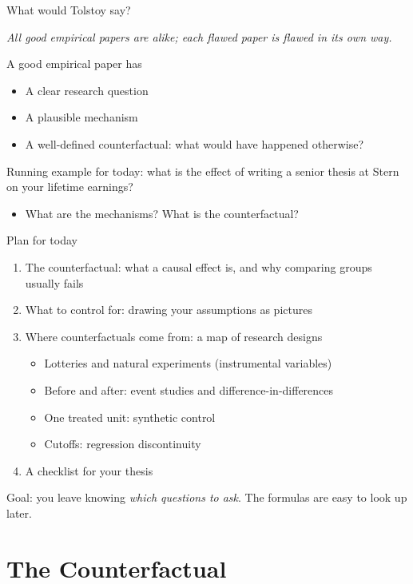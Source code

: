 \documentclass[aspectratio=169,11pt]{beamer}
\begin{document}
\begin{frame}{What would Tolstoy say?}
\begin{center}
\emph{All good empirical papers are alike; each flawed paper is flawed in its own way.}
\end{center}
\bigskip
A good empirical paper has
\begin{itemize}
	\item A clear \alert{research question}
	\item A plausible \alert{mechanism}
	\item A well-defined \alert{counterfactual}: what would have happened otherwise?
\end{itemize}
\bigskip
Running example for today: \alert{what is the effect of writing a senior thesis at Stern on your lifetime earnings?}
\begin{itemize}
	\item What are the mechanisms? What is the counterfactual?
\end{itemize}
\end{frame}


\begin{frame}{Plan for today}
\begin{enumerate}
	\item \alert{The counterfactual}: what a causal effect is, and why comparing groups usually fails
	\item \alert{What to control for}: drawing your assumptions as pictures
	\item \alert{Where counterfactuals come from}: a map of research designs
	\begin{itemize}
		\item Lotteries and natural experiments (instrumental variables)
		\item Before and after: event studies and difference-in-differences
		\item One treated unit: synthetic control
		\item Cutoffs: regression discontinuity
	\end{itemize}
	\item \alert{A checklist for your thesis}
\end{enumerate}
\bigskip
Goal: you leave knowing \emph{which questions to ask}. The formulas are easy to look up later.
\end{frame}


\section{The Counterfactual}
\end{document}
